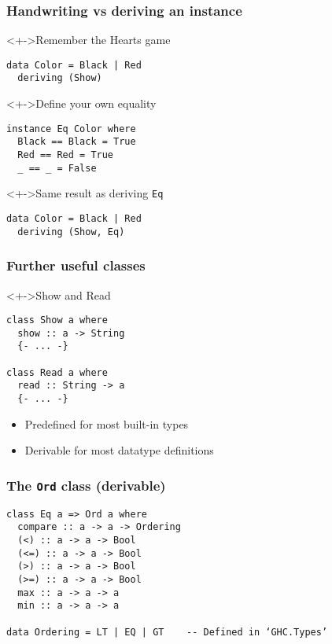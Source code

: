 \documentclass{beamer}
\begin{document}
\begin{frame}[fragile]
  \frametitle{Handwriting vs deriving an instance}
  \begin{block}<+->{Remember the Hearts game}
\begin{verbatim}
data Color = Black | Red
  deriving (Show)
\end{verbatim}
  \end{block}
  \begin{block}<+->{Define your own equality}
\begin{verbatim}
instance Eq Color where
  Black == Black = True
  Red == Red = True
  _ == _ = False
\end{verbatim}
  \end{block}
  \begin{block}<+->{Same result as deriving \texttt{Eq}}
\begin{verbatim}
data Color = Black | Red
  deriving (Show, Eq)
\end{verbatim}
  \end{block}
\end{frame}
\begin{frame}[fragile]
  \frametitle{Further useful classes}
  \begin{block}<+->{Show and Read}
\begin{verbatim}
class Show a where
  show :: a -> String
  {- ... -}

class Read a where
  read :: String -> a
  {- ... -}
\end{verbatim}
    \begin{itemize}
    \item Predefined for most built-in types
    \item Derivable for most datatype definitions
    \end{itemize}
  \end{block}
\end{frame}
\begin{frame}[fragile]
  \frametitle{The \texttt{Ord} class (derivable)}
\begin{verbatim}
class Eq a => Ord a where
  compare :: a -> a -> Ordering
  (<) :: a -> a -> Bool
  (<=) :: a -> a -> Bool
  (>) :: a -> a -> Bool
  (>=) :: a -> a -> Bool
  max :: a -> a -> a
  min :: a -> a -> a

data Ordering = LT | EQ | GT 	-- Defined in ‘GHC.Types’
\end{verbatim}
\end{frame}
\end{document}
